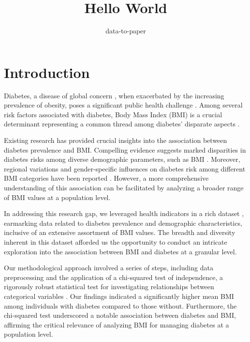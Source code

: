 \documentclass[12pt]{article}
\title{Hello World}
\author{data-to-paper}
\begin{document}
\maketitle

\section{Introduction}

Diabetes, a disease of global concern \cite{Uloko2018PrevalenceAR}, when exacerbated by the increasing prevalence of obesity, poses a significant public health challenge \cite{Mokdad2001TheCE}. Among several risk factors associated with diabetes, Body Mass Index (BMI) is a crucial determinant representing a common thread among diabetes' disparate aspects \cite{Zhu2019RacialEthnicDI, rnlv2010ImpactOB}.

Existing research has provided crucial insights into the association between diabetes prevalence and BMI. Compelling evidence suggests marked disparities in diabetes risks among diverse demographic parameters, such as BMI \cite{Read2021BMIAR}. Moreover, regional variations and gender-specific influences on diabetes risk among different BMI categories have been reported \cite{Rho2014IndependentIO}. However, a more comprehensive understanding of this association can be facilitated by analyzing a broader range of BMI values at a population level. 

In addressing this research gap, we leveraged health indicators in a rich dataset \cite{Deberneh2021PredictionOT}, earmarking data related to diabetes prevalence and demographic characteristics, inclusive of an extensive assortment of BMI values. The breadth and diversity inherent in this dataset afforded us the opportunity to conduct an intricate exploration into the association between BMI and diabetes at a granular level.

Our methodological approach involved a series of steps, including data preprocessing and the application of a chi-squared test of independence, a rigorously robust statistical test for investigating relationships between categorical variables \cite{Mongraw-Chaffin2015TheSA}. Our findings indicated a significantly higher mean BMI among individuals with diabetes compared to those without. Furthermore, the chi-squared test underscored a notable association between diabetes and BMI, affirming the critical relevance of analyzing BMI for managing diabetes at a population level.
\end{document}
